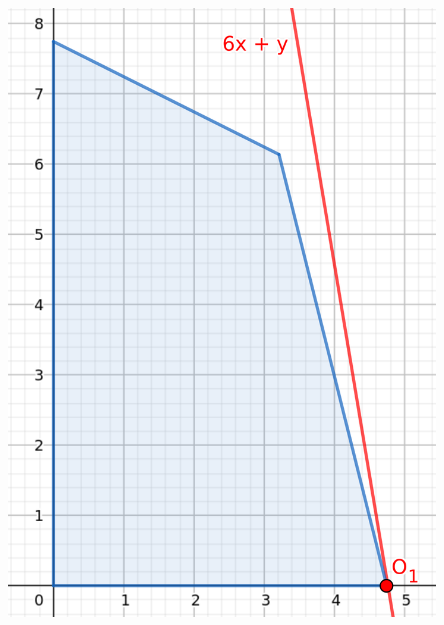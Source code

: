 \documentclass{beamer}
\begin{document}
\begin{frame}
\begin{columns}[T]
\begin{column}{.48\textwidth}
            \includegraphics[width=0.85\textwidth]{images/IP(3).png}
        \end{column}%
        \end{columns}
        
        \addtocounter{framenumber}{-1}

    \end{frame}
    
\end{document}
